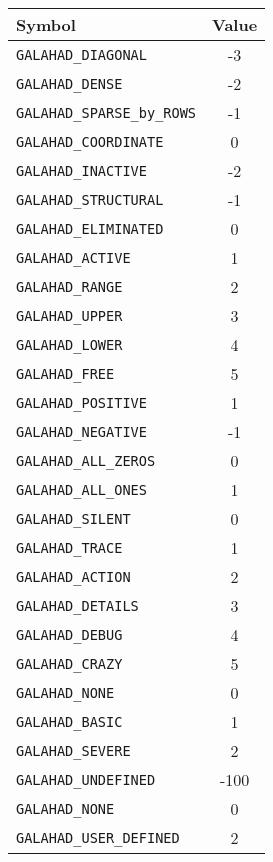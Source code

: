 \documentclass{galahad}
\begin{document}
\begin{figure}[htbf]
\begin{center}
\begin{tabular}{|l|c|}
\hline
Symbol                             & Value \\
\hline
{\tt GALAHAD\_DIAGONAL}            & -3 \\
{\tt GALAHAD\_DENSE}               & -2 \\
{\tt GALAHAD\_SPARSE\_by\_ROWS}    & -1 \\
{\tt GALAHAD\_COORDINATE}          &  0 \\
\hline
{\tt GALAHAD\_INACTIVE}            & -2 \\
{\tt GALAHAD\_STRUCTURAL}          & -1 \\
{\tt GALAHAD\_ELIMINATED}          &  0 \\
{\tt GALAHAD\_ACTIVE}              &  1 \\
{\tt GALAHAD\_RANGE}               &  2 \\
{\tt GALAHAD\_UPPER}               &  3 \\
{\tt GALAHAD\_LOWER}               &  4 \\
{\tt GALAHAD\_FREE}                &  5 \\
\hline
{\tt GALAHAD\_POSITIVE}            &  1 \\
{\tt GALAHAD\_NEGATIVE}            & -1 \\
\hline
{\tt GALAHAD\_ALL\_ZEROS}          &  0 \\
{\tt GALAHAD\_ALL\_ONES}           &  1 \\
\hline
{\tt GALAHAD\_SILENT}               &  0 \\
{\tt GALAHAD\_TRACE}                &  1 \\
{\tt GALAHAD\_ACTION}               &  2 \\
{\tt GALAHAD\_DETAILS}              &  3 \\
{\tt GALAHAD\_DEBUG}                &  4 \\
{\tt GALAHAD\_CRAZY}                &  5 \\
\hline
{\tt GALAHAD\_NONE}                 &  0 \\
{\tt GALAHAD\_BASIC}                &  1 \\
{\tt GALAHAD\_SEVERE}               &  2 \\
\hline
{\tt GALAHAD\_UNDEFINED}            & -100 \\
{\tt GALAHAD\_NONE}                 &  0 \\
{\tt GALAHAD\_USER\_DEFINED}        &  2 \\

\end{tabular}
\end{center}
\end{figure}
\end{document}

